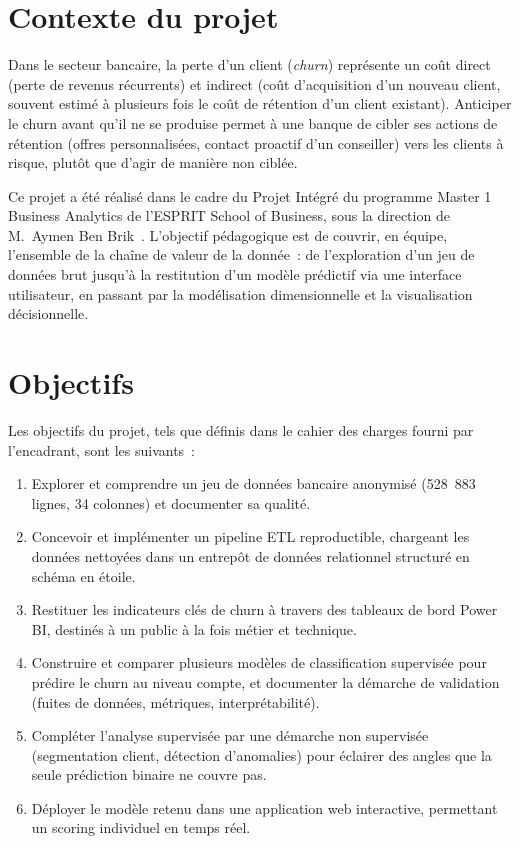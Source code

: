 \documentclass[11pt,a4paper]{report}
\begin{document}
\section{Contexte du projet}

Dans le secteur bancaire, la perte d'un client (\emph{churn}) repr\'esente un
co\^ut direct (perte de revenus r\'ecurrents) et indirect (co\^ut d'acquisition
d'un nouveau client, souvent estim\'e \`a plusieurs fois le co\^ut de r\'etention
d'un client existant). Anticiper le churn avant qu'il ne se produise permet
\`a une banque de cibler ses actions de r\'etention (offres personnalis\'ees,
contact proactif d'un conseiller) vers les clients \`a risque, plut\^ot que
d'agir de mani\`ere non cibl\'ee.

Ce projet a \'et\'e r\'ealis\'e dans le cadre du Projet Int\'egr\'e du programme
Master 1 Business Analytics de l'ESPRIT School of Business, sous la direction
de M.~Aymen Ben Brik~\citep{benbrik2026cours}. L'objectif p\'edagogique est de
couvrir, en \'equipe, l'ensemble de la cha\^ine de valeur de la donn\'ee~: de
l'exploration d'un jeu de donn\'ees brut jusqu'\`a la restitution d'un mod\`ele
pr\'edictif via une interface utilisateur, en passant par la mod\'elisation
dimensionnelle et la visualisation d\'ecisionnelle.

\section{Objectifs}

Les objectifs du projet, tels que d\'efinis dans le cahier des charges fourni
par l'encadrant, sont les suivants~:

\begin{enumerate}
\item Explorer et comprendre un jeu de donn\'ees bancaire anonymis\'e
      (528~883 lignes, 34 colonnes) et documenter sa qualit\'e.
\item Concevoir et impl\'ementer un pipeline ETL reproductible, chargeant les
      donn\'ees nettoy\'ees dans un entrep\^ot de donn\'ees relationnel structur\'e
      en sch\'ema en \'etoile.
\item Restituer les indicateurs cl\'es de churn \`a travers des tableaux de
      bord Power BI, destin\'es \`a un public \`a la fois m\'etier et technique.
\item Construire et comparer plusieurs mod\`eles de classification supervis\'ee
      pour pr\'edire le churn au niveau compte, et documenter la d\'emarche de
      validation (fuites de donn\'ees, m\'etriques, interpr\'etabilit\'e).
\item Compl\'eter l'analyse supervis\'ee par une d\'emarche non supervis\'ee
      (segmentation client, d\'etection d'anomalies) pour \'eclairer des angles
      que la seule pr\'ediction binaire ne couvre pas.
\item D\'eployer le mod\`ele retenu dans une application web interactive,
      permettant un scoring individuel en temps r\'eel.
\end{enumerate}
\end{document}

